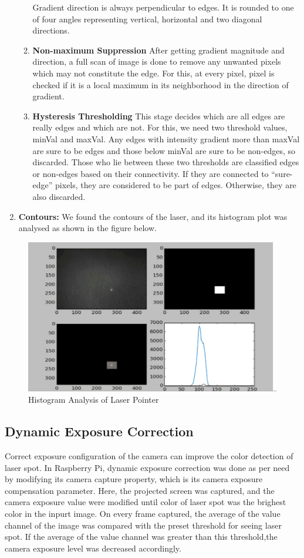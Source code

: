 \documentclass[12pt, a4paper]{article}
\begin{document}
\begin{enumerate}
\begin{enumerate}
Gradient direction is always perpendicular to edges. It is rounded to one of four angles   representing vertical, horizontal and two diagonal directions.
\item \textbf{Non-maximum Suppression}
After getting gradient magnitude and direction, a full scan of image is done to remove any unwanted pixels which may not constitute the edge. For this, at every pixel, pixel is checked ­if it is a local maximum in its neighborhood in the direction of gradient.

\item \textbf{Hysteresis Thresholding}
This stage decides which are all edges are really edges and which are not. For this, we need two threshold values, minVal and maxVal. Any edges with intensity gradient more than maxVal are sure to be edges and those below minVal are sure to be non-edges, so discarded. Those who lie between these two thresholds are classified edges or non-edges based on their connectivity. If they are connected to “sure-edge” pixels, they are considered to be part of edges. Otherwise, they are also discarded.
\end{enumerate}
\item \textbf{Contours:}
We found the contours of the laser, and its histogram plot was analysed as shown in the figure below.
\end{enumerate}


\begin{figure}[htp]
	\centering
	\includegraphics[scale=0.35]{histogram.png}
	\caption{Histogram Analysis of Laser Pointer}
	\label{}
\end{figure}

\subsection{Dynamic Exposure Correction}
	Correct exposure configuration of the camera can improve the color detection of laser spot. In Raspberry Pi, dynamic exposure correction was done as per need by modifying its camera capture property, which is its camera exposure compensation parameter. Here, the projected screen was captured, and the camera exposure value were modified until color of laser spot was the brighest color in the inpurt image. On every frame captured, the average of the value channel of the image was compared with the preset threshold for seeing laser spot. If the average of the value channel was greater than this threshold,the camera exposure level was decreased accordingly.
\end{document}
